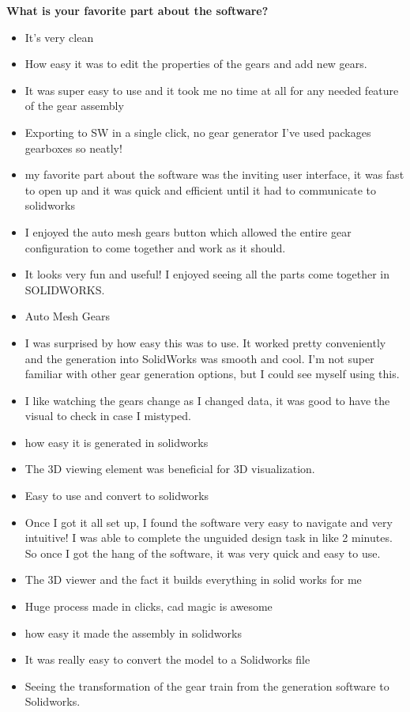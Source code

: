 \noindent\textbf{What is your favorite part about the software?}
\begin{itemize}
    \item It's very clean
\item How easy it was to edit the properties of the gears and add new gears.
\item It was super easy to use and it took me no time at all for any needed feature of the gear assembly
\item Exporting to SW in a single click, no gear generator I've used packages gearboxes so neatly!  
\item my favorite part about the software was the inviting user interface, it was fast to open up and it was quick and efficient until it had to communicate to solidworks
\item I enjoyed the auto mesh gears button which allowed the entire gear configuration to come together and work as it should.
\item It looks very fun and useful! I enjoyed seeing all the parts come together in SOLIDWORKS. 
\item Auto Mesh Gears
\item I was surprised by how easy this was to use. It worked pretty conveniently and the generation into SolidWorks was smooth and cool. I'm not super familiar with other gear generation options, but I could see myself using this.
\item I like watching the gears change as I changed data, it was good to have the visual to check in case I mistyped.
\item how easy it is generated in solidworks
\item The 3D viewing element was beneficial for 3D visualization.
\item Easy to use and convert to solidworks
\item Once I got it all set up, I found the software very easy to navigate and very intuitive! I was able to complete the unguided design task in like 2 minutes. So once I got the hang of the software, it was very quick and easy to use.
\item The 3D viewer and the fact it builds everything in solid works for me 
\item Huge process made in clicks, cad magic is awesome
\item how easy it made the assembly in solidworks
\item It was really easy to convert the model to a Solidworks file
\item Seeing the transformation of the gear train from the generation software to Solidworks.

\end{itemize}
